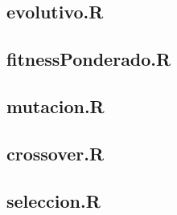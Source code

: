 \documentclass{article}
\begin{document}
\subsection{evolutivo.R}

\subsection{fitnessPonderado.R}

\subsection{mutacion.R}

\subsection{crossover.R}

\subsection{seleccion.R}

\end{document}
